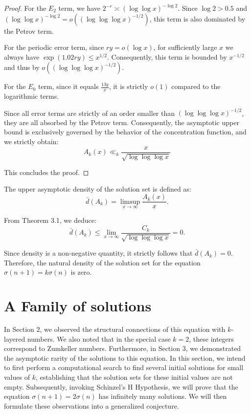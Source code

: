 \documentclass[12pt, a4paper]{article}
\theoremstyle{plain}
\theoremstyle{definition}
\begin{document}
\begin{proof}
For the $E_2$ term, we have $2^{-r} \asymp (\log \log x)^{-\log 2}$. Since  $\log 2 > 0.5$ and $(\log \log x)^{-\log 2} = o((\log \log \log x)^{-1/2})$, this term is also dominated by the Petrov term.

For the periodic error term, since $ry = o(\log x)$, for sufficiently large $x$ we always have $\exp(1.02ry) \leq x^{1/2}$. Consequently, this term is bounded by $x^{-1/2}$ and thus by $o((\log \log \log x)^{-1/2})$.

For the $E_0$ term, since it equals $\frac{13y}{x}$, it is strictly $o(1)$ compared to the logarithmic terms.

Since all error terms are strictly of an order smaller than $(\log \log \log x)^{-1/2}$, they are all absorbed by the Petrov term. Consequently, the asymptotic upper bound is exclusively governed by the behavior of the concentration function, and we strictly obtain:
\[ A_k(x) \ll_k \frac{x}{\sqrt{\log \log \log x}} \]

This concludes the proof.
\end{proof}

The upper asymptotic density of the solution set is defined as:
\[ \bar{d}(A_k) = \limsup_{x \to \infty} \frac{A_k(x)}{x}. \]

From Theorem 3.1, we deduce:
\[ \bar{d}(A_k) \leq \lim_{x \to \infty} \frac{C_k}{\sqrt{\log \log \log x}} = 0. \]

Since density is a non-negative quantity, it strictly follows that $\bar{d}(A_k) = 0$. Therefore, the natural density of the solution set for the equation $\sigma(n + 1) = k\sigma(n)$ is zero.

\section{A Family of solutions}
In Section 2, we observed the structural connections of this equation with $k$-layered numbers. We also noted that in the special case $k = 2$, these integers correspond to Zumkeller numbers. Furthermore, in Section 3, we demonstrated the asymptotic rarity of the solutions to this equation. In this section, we intend to first perform a computational search to find several initial solutions for small values of $k$, establishing that the solution sets for these initial values are not empty. Subsequently, invoking Schinzel's H Hypothesis, we will prove that the equation $\sigma(n + 1) = 2\sigma(n)$ has infinitely many solutions. We will then formulate these observations into a generalized conjecture.
\end{document}
